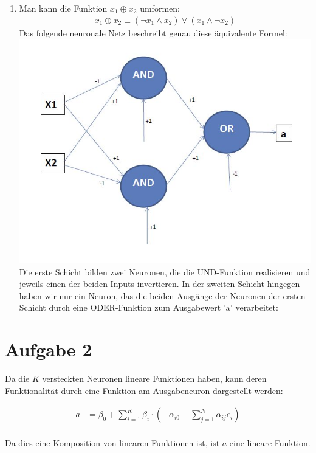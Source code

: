 \documentclass[a4paper,10pt]{article}
\begin{document}
\begin{enumerate}[~~a.)]
	 \item
    Man kann die Funktion $x_1 \oplus x_2$ umformen:
    \begin{align*}
        x_1 \oplus x_2 \equiv (\lnot x_1 \land x_2) \lor (x_1 \land \lnot x_2)
    \end{align*}
    Das folgende neuronale Netz beschreibt genau diese äquivalente Formel: \\
        \includegraphics[scale=0.65]{network.jpg} \\
    Die erste Schicht bilden zwei Neuronen, die die UND-Funktion realisieren und jeweils einen der beiden Inputs invertieren. In der zweiten Schicht hingegen haben wir nur ein Neuron, das die beiden Ausgänge der Neuronen der ersten Schicht durch eine ODER-Funktion zum Ausgabewert 'a' verarbeitet: 
	\end{enumerate}

\section*{Aufgabe 2}
Da die $K$ versteckten Neuronen lineare Funktionen haben, kann deren Funktionalität durch eine Funktion am Ausgabeneuron dargestellt werden:

\begin{align*}
a &= \beta_0 + \sum_{i=1}^K \beta_i \cdot (-\alpha_{i0}  + \sum_{j=1}^N \alpha_{ij}e_i) \\
\end{align*}

Da dies eine Komposition von linearen Funktionen ist, ist $a$ eine lineare Funktion.
\end{document}
